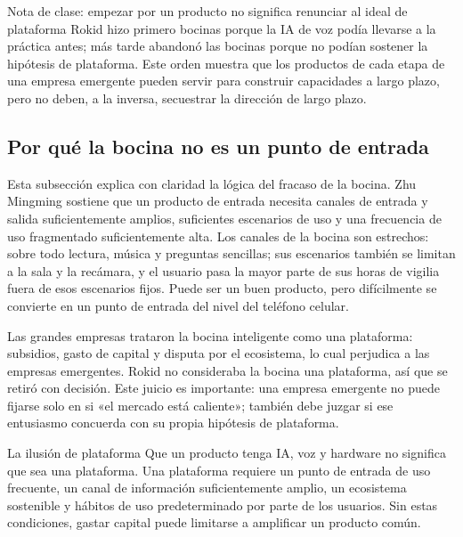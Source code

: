 \begin{knowledgebox}{Nota de clase: empezar por un producto no significa renunciar al ideal de plataforma}
Rokid hizo primero bocinas porque la IA de voz podía llevarse a la práctica antes; más tarde abandonó las bocinas porque no podían sostener la hipótesis de plataforma. Este orden muestra que los productos de cada etapa de una empresa emergente pueden servir para construir capacidades a largo plazo, pero no deben, a la inversa, secuestrar la dirección de largo plazo.
\end{knowledgebox}

\subsection{Por qué la bocina no es un punto de entrada}

Esta subsección explica con claridad la lógica del fracaso de la bocina. Zhu Mingming sostiene que un producto de entrada necesita canales de entrada y salida suficientemente amplios, suficientes escenarios de uso y una frecuencia de uso fragmentado suficientemente alta. Los canales de la bocina son estrechos: sobre todo lectura, música y preguntas sencillas; sus escenarios también se limitan a la sala y la recámara, y el usuario pasa la mayor parte de sus horas de vigilia fuera de esos escenarios fijos. Puede ser un buen producto, pero difícilmente se convierte en un punto de entrada del nivel del teléfono celular.

Las grandes empresas trataron la bocina inteligente como una plataforma: subsidios, gasto de capital y disputa por el ecosistema, lo cual perjudica a las empresas emergentes. Rokid no consideraba la bocina una plataforma, así que se retiró con decisión. Este juicio es importante: una empresa emergente no puede fijarse solo en si «el mercado está caliente»; también debe juzgar si ese entusiasmo concuerda con su propia hipótesis de plataforma.

\begin{warningbox}{La ilusión de plataforma}
Que un producto tenga IA, voz y hardware no significa que sea una plataforma. Una plataforma requiere un punto de entrada de uso frecuente, un canal de información suficientemente amplio, un ecosistema sostenible y hábitos de uso predeterminado por parte de los usuarios. Sin estas condiciones, gastar capital puede limitarse a amplificar un producto común.
\end{warningbox}

